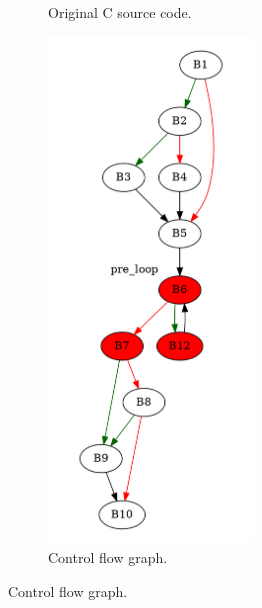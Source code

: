 \begin{figure}[htbp]
	\centering
	\begin{subfigure}[b]{0.30\textwidth}
		\centering
		
		\caption{Original C source code.}
	\end{subfigure}
	\begin{subfigure}[b]{0.50\textwidth}
		\centering
		\includegraphics[width=0.6\textwidth]{inc/appendices/examples/hammock/counter-example/jump-threading-and-short-circuit/jump-threading-and-short-circuit_jump/f_0003a.png}
		\caption{Control flow graph.}
	\end{subfigure}
\end{figure}

